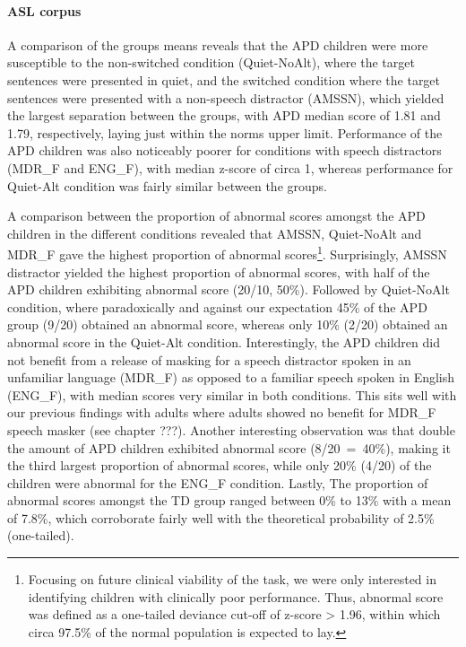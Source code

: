 \documentclass[a4paper, twoside]{templates/ociamthesis}
\begin{document}
\hypertarget{asl-corpus}{%
\paragraph*{ASL corpus}\label{asl-corpus}}

A comparison of the groups means reveals that the APD children were more susceptible to the non-switched condition (Quiet-NoAlt), where the target sentences were presented in quiet, and the switched condition where the target sentences were presented with a non-speech distractor (AMSSN), which yielded the largest separation between the groups, with APD median score of 1.81 and 1.79, respectively, laying just within the norms upper limit. Performance of the APD children was also noticeably poorer for conditions with speech distractors (MDR\_F and ENG\_F), with median z-score of circa 1, whereas performance for Quiet-Alt condition was fairly similar between the groups.

A comparison between the proportion of abnormal scores amongst the APD children in the different conditions revealed that AMSSN, Quiet-NoAlt and MDR\_F gave the highest proportion of abnormal scores\footnote{Focusing on future clinical viability of the task, we were only interested in identifying children with clinically poor performance. Thus, abnormal score was defined as a one-tailed deviance cut-off of z-score \textgreater{} 1.96, within which circa 97.5\% of the normal population is expected to lay.}.
Surprisingly, AMSSN distractor yielded the highest proportion of abnormal scores, with half of the APD children exhibiting abnormal score (20/10, 50\%). Followed by Quiet-NoAlt condition, where paradoxically and against our expectation 45\% of the APD group (9/20) obtained an abnormal score, whereas only 10\% (2/20) obtained an abnormal score in the Quiet-Alt condition. Interestingly, the APD children did not benefit from a release of masking for a speech distractor spoken in an unfamiliar language (MDR\_F) as opposed to a familiar speech spoken in English (ENG\_F), with median scores very similar in both conditions. This sits well with our previous findings with adults where adults showed no benefit for MDR\_F speech masker (see chapter ???). Another interesting observation was that double the amount of APD children exhibited abnormal score (8/20~=~40\%), making it the third largest proportion of abnormal scores, while only 20\% (4/20) of the children were abnormal for the ENG\_F condition. Lastly, The proportion of abnormal scores amongst the TD group ranged between 0\% to 13\% with a mean of 7.8\%, which corroborate fairly well with the theoretical probability of 2.5\% (one-tailed).
\end{document}
